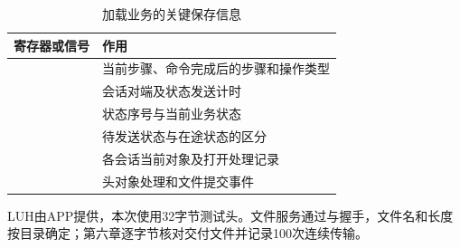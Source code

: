 \begin{table}[htbp]\centering\small
\caption{加载业务的关键保存信息}
\begin{tabularx}{\linewidth}{@{}l Y@{}}\toprule 寄存器或信号 & 作用\\\midrule
{} & 当前步骤、命令完成后的步骤和操作类型\\
 & 会话对端及状态发送计时\\
 & 状态序号与当前业务状态\\
 & 待发送状态与在途状态的区分\\
 & 各会话当前对象及打开处理记录\\
 & 头对象处理和文件提交事件\\\bottomrule
\end{tabularx}\end{table}

LUH由APP提供，本次使用32字节测试头。文件服务通过与握手，文件名和长度按目录确定；第六章逐字节核对交付文件并记录100次连续传输。

